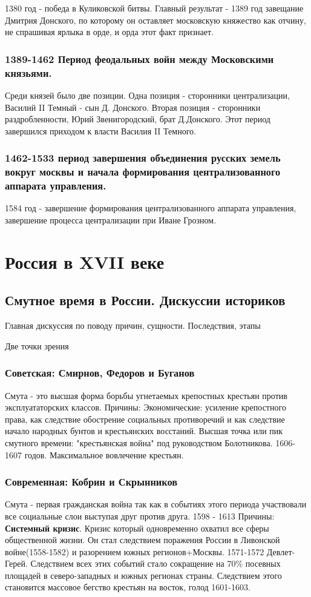 \documentclass[a4paper]{article}
\begin{document}
1380 год - победа в Куликовской битвы. Главный результат - 1389 год завещание Дмитрия Донского, по которому он оставляет московскую княжество как отчину, не спрашивая ярлыка в орде, и орда этот факт признает.

\subsubsection{1389-1462 Период феодальных войн между Московскими князьями. }
Среди князей было две позиции.
Одна позиция - сторонники централизации, Василий II Темный - сын Д. Донского.
Вторая позиция - сторонники раздробленности,
Юрий Звенигородский, брат Д.Донского.
Этот период завершился приходом к власти Василия II Темного.

\subsubsection{ 1462-1533 период завершения объединения русских земель вокруг москвы и начала формирования централизованного аппарата управления.}
1584 год - завершение формирования централизованного аппарата управления, завершение процесса централизации при Иване Грозном.


\section{Россия в XVII веке}

\subsection{Смутное время в России. Дискуссии историков}
Главная дискуссия по поводу причин, сущности. Последствия, этапы

Две точки зрения

\subsubsection{Советская: Смирнов, Федоров и Буганов}
Смута - это высшая форма борьбы угнетаемых крепостных крестьян против эксплуататорских классов.
Причины:
Экономические: усиление крепостного права, как следствие обострение социальных противоречий и как следствие начало народных бунтов и крестьянских восстаний.
Высшая точка или пик смутного времени: "крестьянская война" под руководством Болотникова. 1606-1607 годов. Максимальное вовлечение крестьян.
\subsubsection{Современная: Кобрин и Скрынников}
Смута - первая гражданская война так как в событиях этого периода участвовали все социальные слои выступая друг против друга. 1598 - 1613
Причины:
    \textbf{Системный кризис}. Кризис который одновременно охватил все сферы общественной жизни. Он стал следствием поражения России в Ливонской войне(1558-1582) и разорением южных регионов+Москвы. 1571-1572 Девлет-Герей. Следствием всех этих событий стало сокращение на 70\% посевных площадей в северо-западных и южных регионах страны. Следствием этого становится массовое бегство крестьян на восток, голод 1601-1603.
\end{document}

